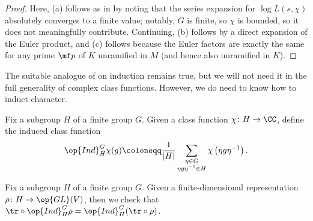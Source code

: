 \documentclass[../thesis.tex]{subfiles}
\begin{document}
\begin{proof}
	Here, (a) follows as in  by noting that the series expansion for $\log L(s,\chi)$ absolutely converges to a finite value; notably, $G$ is finite, so $\chi$ is bounded, so it does not meaningfully contribute. Continuing, (b) follows by a direct expansion of the Euler product, and (c) follows because the Euler factors are exactly the same for any prime $\mf p$ of $K$ unramified in $M$ (and hence also unramified in $K$).
\end{proof}
The suitable analogue of  on induction remains true, but we will not need it in the full generality of complex class functions. However, we do need to know how to induct character.
\begin{notation}
	Fix a subgroup $H$ of a finite group $G$. Given a class function $\chi\colon H\to\CC$, define the induced class function
	\[\op{Ind}_H^G\chi(g)\coloneqq\frac1{\left|H\right|}\sum_{\substack{\eta\in G\\\eta g\eta^{-1}\in H}}\chi\left(\eta g\eta^{-1}\right).\]
\end{notation}
\begin{lemma}
	Fix a subgroup $H$ of a finite group $G$. Given a finite-dimensional representation $\rho\colon H\to\op{GL}(V)$, then we check that ${\tr}\circ\op{Ind}_H^G\rho=\op{Ind}_H^G({\tr}\circ\rho)$.
\end{lemma}
\end{document}
